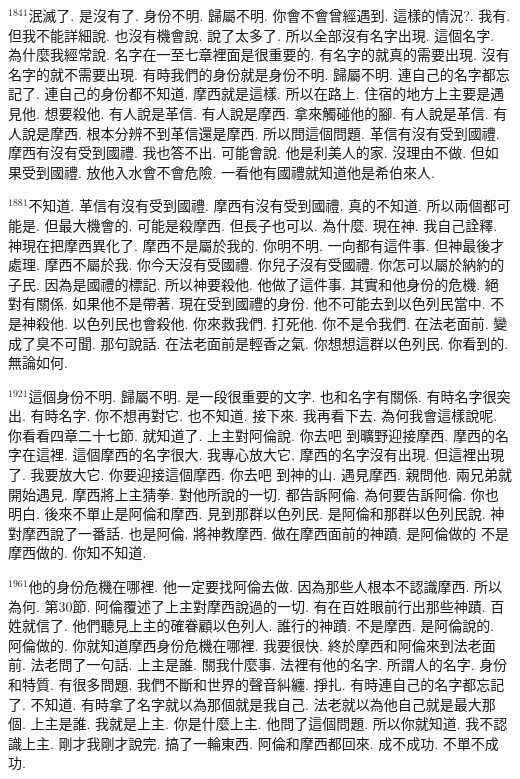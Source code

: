 \documentclass{book}
\begin{document}
$^{1841}$泯滅了.
是沒有了.
身份不明.
歸屬不明.
你會不會曾經遇到.
這樣的情況?.
我有.
但我不能詳細說.
也沒有機會說.
說了太多了.
所以全部沒有名字出現.
這個名字.
為什麼我經常說.
名字在一至七章裡面是很重要的.
有名字的就真的需要出現.
沒有名字的就不需要出現.
有時我們的身份就是身份不明.
歸屬不明.
連自己的名字都忘記了.
連自己的身份都不知道.
摩西就是這樣.
所以在路上.
住宿的地方上主要是遇見他.
想要殺他.
有人說是革信.
有人說是摩西.
拿來觸碰他的腳.
有人說是革信.
有人說是摩西.
根本分辨不到革信還是摩西.
所以問這個問題.
革信有沒有受到國禮.
摩西有沒有受到國禮.
我也答不出.
可能會說.
他是利美人的家.
沒理由不做.
但如果受到國禮.
放他入水會不會危險.
一看他有國禮就知道他是希伯來人.

$^{1881}$不知道.
革信有沒有受到國禮.
摩西有沒有受到國禮.
真的不知道.
所以兩個都可能是.
但最大機會的.
可能是殺摩西.
但長子也可以.
為什麼.
現在神.
我自己詮釋.
神現在把摩西異化了.
摩西不是屬於我的.
你明不明.
一向都有這件事.
但神最後才處理.
摩西不屬於我.
你今天沒有受國禮.
你兒子沒有受國禮.
你怎可以屬於納約的子民.
因為是國禮的標記.
所以神要殺他.
他做了這件事.
其實和他身份的危機.
絕對有關係.
如果他不是帶著.
現在受到國禮的身份.
他不可能去到以色列民當中.
不是神殺他.
以色列民也會殺他.
你來救我們.
打死他.
你不是令我們.
在法老面前.
變成了臭不可聞.
那句說話.
在法老面前是輕香之氣.
你想想這群以色列民.
你看到的.
無論如何.

$^{1921}$這個身份不明.
歸屬不明.
是一段很重要的文字.
也和名字有關係.
有時名字很突出.
有時名字.
你不想再對它.
也不知道.
接下來.
我再看下去.
為何我會這樣說呢.
你看看四章二十七節.
就知道了.
上主對阿倫說.
你去吧 到曠野迎接摩西.
摩西的名字在這裡.
這個摩西的名字很大.
我專心放大它.
摩西的名字沒有出現.
但這裡出現了.
我要放大它.
你要迎接這個摩西.
你去吧 到神的山.
遇見摩西.
親問他.
兩兄弟就開始遇見.
摩西將上主猜拳.
對他所說的一切.
都告訴阿倫.
為何要告訴阿倫.
你也明白.
後來不單止是阿倫和摩西.
見到那群以色列民.
是阿倫和那群以色列民說.
神對摩西說了一番話.
也是阿倫.
將神教摩西.
做在摩西面前的神蹟.
是阿倫做的 不是摩西做的.
你知不知道.

$^{1961}$他的身份危機在哪裡.
他一定要找阿倫去做.
因為那些人根本不認識摩西.
所以為何.
第30節.
阿倫覆述了上主對摩西說過的一切.
有在百姓眼前行出那些神蹟.
百姓就信了.
他們聽見上主的確眷顧以色列人.
誰行的神蹟.
不是摩西.
是阿倫說的.
阿倫做的.
你就知道摩西身份危機在哪裡.
我要很快.
終於摩西和阿倫來到法老面前.
法老問了一句話.
上主是誰.
關我什麼事.
法裡有他的名字.
所謂人的名字.
身份和特質.
有很多問題.
我們不斷和世界的聲音糾纏.
掙扎.
有時連自己的名字都忘記了.
不知道.
有時拿了名字就以為那個就是我自己.
法老就以為他自己就是最大那個.
上主是誰.
我就是上主.
你是什麼上主.
他問了這個問題.
所以你就知道.
我不認識上主.
剛才我剛才說完.
搞了一輪東西.
阿倫和摩西都回來.
成不成功.
不單不成功.
\end{document}
